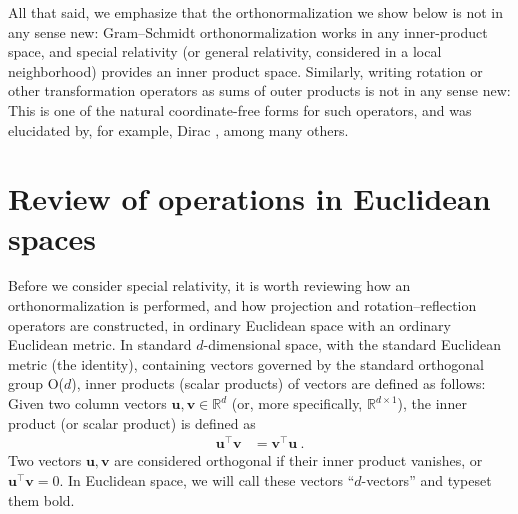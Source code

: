 \documentclass{article}
\newcommand{\Evec}[1]{{\mathbf{#1}}} %
\begin{document}
All that said, we emphasize that the orthonormalization we show below is not in any sense new:
Gram--Schmidt orthonormalization works in any inner-product space, and special relativity (or general relativity, considered in a local neighborhood) provides an inner product space.
Similarly, writing rotation or other transformation operators as sums of outer products is not in any sense new:
This is one of the natural coordinate-free forms for such operators, and was elucidated by, for example, Dirac \cite{dirac}, among many others.

\section{Review of operations in Euclidean spaces}\label{sec:od}

Before we consider special relativity, it is worth reviewing how an orthonormalization is performed, and how projection and rotation--reflection operators are constructed, in ordinary Euclidean space with an ordinary Euclidean metric.
In standard $d$-dimensional space, with the standard Euclidean metric (the identity), containing vectors governed by the standard orthogonal group O($d$), inner products (scalar products) of vectors are defined as follows:
Given two column vectors $\Evec{u},\Evec{v}\in\mathbb{R}^d$ (or, more specifically, $\mathbb{R}^{d\times1}$), the inner product (or scalar product) is defined as
\begin{align}
    \Evec{u}^\top \Evec{v} &= \Evec{v}^\top \Evec{u} ~.
\end{align}
Two vectors $\Evec{u},\Evec{v}$ are considered orthogonal if their inner product vanishes, or $\Evec{u}^\top\Evec{v}=0$.
In Euclidean space, we will call these vectors ``$d$-vectors'' and typeset them bold.
\end{document}
